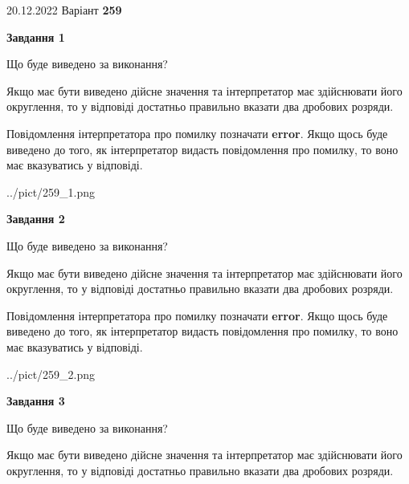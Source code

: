 \documentclass[12pt, ukrainian]{article}
\begin{document}
{20.12.2022 Варіант \No \textbf { 259 }\par}
{
\begin {Large}

{\begin {center}\textbf{Завдання 1}\end {center}}\par
Що буде виведено за виконання? \par

Якщо має бути виведено дійсне значення та інтерпретатор має здійснювати його округлення, 
то у відповіді достатньо правильно вказати два дробових розряди.

Повідомлення інтерпретатора про помилку позначати \textbf{error}.
Якщо щось буде виведено до того, як інтерпретатор видасть повідомлення про помилку, 
то воно має вказуватись у відповіді. \par

\begin{center}
	{../pict/259_1.png}
\end{center}
\newpage

{\begin {center}\textbf{Завдання 2}\end {center}}\par
Що буде виведено за виконання? \par

Якщо має бути виведено дійсне значення та інтерпретатор має здійснювати його округлення, 
то у відповіді достатньо правильно вказати два дробових розряди.

Повідомлення інтерпретатора про помилку позначати \textbf{error}.
Якщо щось буде виведено до того, як інтерпретатор видасть повідомлення про помилку, 
то воно має вказуватись у відповіді. \par

\begin{center}
	{../pict/259_2.png}
\end{center}
\newpage

{\begin {center}\textbf{Завдання 3}\end {center}}\par
Що буде виведено за виконання? \par

Якщо має бути виведено дійсне значення та інтерпретатор має здійснювати його округлення, 
то у відповіді достатньо правильно вказати два дробових розряди.


\end{Large}}
\end{document}
